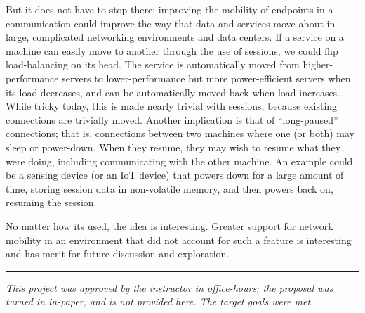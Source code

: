 \documentclass[twocolumn,11pt]{article}
\begin{document}
But it does not have to stop there; improving the mobility of
endpoints in a communication could improve the way that data and services move
about in large, complicated networking environments and data centers. If a
service on a machine can easily move to another through the use of sessions, we
could flip load-balancing on its head. The service is automatically moved from
higher-performance servers to lower-performance but more power-efficient servers
when its load decreases, and can be automatically moved back when load
increases. While tricky today, this is made nearly trivial with sessions, because existing connections
are trivially moved. Another implication is that of ``long-paused'' connections;
that is, connections between two machines where one (or both) may sleep or
power-down. When they resume, they may wish to resume what they were doing,
including communicating with the other machine. An example could be a sensing
device (or an IoT device) that powers down for a large amount of time, storing
session data in non-volatile memory, and then powers back on, resuming the
session.

No matter how its used, the idea is interesting. Greater support for network
mobility in an environment that did not account for such a feature is
interesting and has merit for future discussion and exploration.

\begin{center}\rule{2cm}{0.1pt}\end{center}

\textit{{\small
This project was approved by the instructor in office-hours; the proposal was
turned in in-paper, and is not provided here. The target goals were met.
}}









\end{document}
